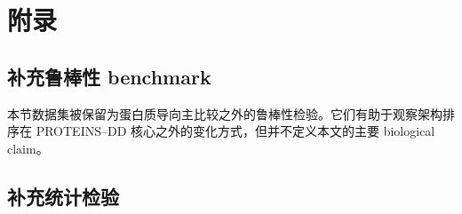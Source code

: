 \appendix

\section{附录}
\label{sec:appendix}

\subsection{补充鲁棒性 benchmark}

本节数据集被保留为蛋白质导向主比较之外的鲁棒性检验。它们有助于观察架构排序在 PROTEINS--DD 核心之外的变化方式，但并不定义本文的主要 biological claim。



\subsection{补充统计检验}



